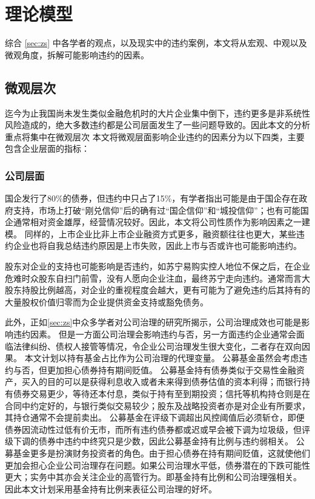 
\chapter{理论模型}
综合 \ref{sec:zs} 中各学者的观点，以及现实中的违约案例，本文将从宏观、中观以及微观角度，拆解可能影响违约的因素。
\section{微观层次}
迄今为止我国尚未发生类似金融危机时的大片企业集中倒下，违约更多是非系统性风险造成的，绝大多数违约都是公司层面发生了一些问题导致的。因此本文的分析重点将集中在微观层次
本文将微观层面影响企业违约的因素分为以下四类，主要包含企业层面的指标：
\subsection{公司层面}

国企发行了80\%的债券，但违约中只占了15\%，有学者指出可能是由于国企存在政府支持\cite{mo2021china}，市场上打破“刚兑信仰”后的确有过“国企信仰”和“城投信仰”；也有可能国企通常相对资金雄厚，经营情况较好。因此，本文将公司性质作为影响因素之一建模。
同样的，上市企业比非上市企业融资方式更多，融资额往往也更大，某些违约企业也将自我总结违约原因是上市失败，因此上市与否或许也可能影响违约。

股东对企业的支持也可能影响是否违约，如苏宁易购实控人地位不保之后，在企业危难时众股东自扫门前雪，没有人愿向企业注血，最终苏宁走向违约。通常而言大股东持股比例越高，对企业的重视程度会越大，更有可能为了避免违约后其持有的大量股权价值归零而为企业提供资金支持或豁免债务。

此外，正如\ref{sec:zs}中众多学者对公司治理的研究所揭示，公司治理成效也可能是影响违约因素。
但是一方面公司治理会影响违约与否，另一方面违约企业通常会面临法律纠纷、债权人接管等情况，令企业公司治理发生很大变化，二者存在双向因果。
本文计划以持有基金占比作为公司治理的代理变量。
公募基金虽然会考虑违约与否，但更加担心债券持有期间贬值。
公募基金持有债券类似于交易性金融资产，买入的目的可以是获得利息收入或者未来得到债券估值的资本利得；而银行持有债券交易更少，等待还本付息，类似于持有至到期投资；信托等机构持仓则是在合同中约定好的，与银行类似交易较少；股东及战略投资者亦是对企业有所要求，其持仓通常不会提前卖出。
公募基金在评级下调超出风控阈值后必须斩仓，即便债券因流动性过低有价无市，而所有违约债券都或迟或早会被下调为垃圾级，但评级下调的债券中违约中终究只是少数，因此公募基金持有比例与违约弱相关。
公募基金更多是扮演财务投资者的角色。由于担心债券在持有期间贬值，这就使他们更加会担心企业公司治理存在问题。如果公司治理水平低，债券潜在的下跌可能性更大\Parencite{anginer2018corporate}；实务中其亦会关注企业的高管行为。即基金持有比例和公司治理强相关。
因此本文计划采用基金持有比例来表征公司治理的好坏。

